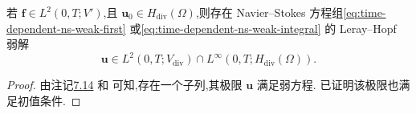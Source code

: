 \begin{theorem}\label{thm:time-dependent-leray-hopf-existence}
若 $\bm{f}\in L^2(0,T;V')$,且 $\bm{u}_0\in H_{\mathrm{div}}(\Omega)$,则存在 Navier--Stokes 方程组\cref{eq:time-dependent-ns-weak-first} 或\cref{eq:time-dependent-ns-weak-integral} 的 Leray--Hopf 弱解
\[
  \bm{u}\in L^2(0,T;V_{\mathrm{div}})
       \cap L^\infty(0,T;H_{\mathrm{div}}(\Omega)).
\]
\begin{proof}
由注记\hyperref[note:time-dependent-galerkin-linear-convergence]{7.14} 和 可知,存在一个子列,其极限 $\bm{u}$ 满足弱方程. 已证明该极限也满足初值条件.
\end{proof}
\end{theorem}



